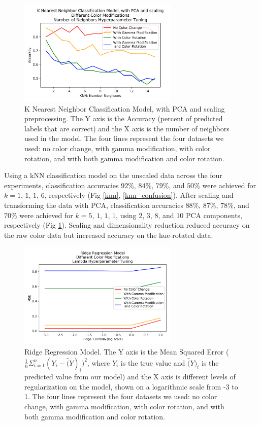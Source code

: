 \documentclass[journal]{IEEEtran}
\begin{document}
\begin{figure}
\centering
\includegraphics[height=2in]{KNN_clf_PCA/knn_classification.png}
\caption{K Nearest Neighbor Classification Model, with PCA and scaling preprocessing. The Y axis is the Accuracy (percent of predicted labels that are correct) and the X axis is the number of neighbors used in the model. The four lines represent the four datasets we used: no color change, with gamma modification, with color rotation, and with both gamma modification and color rotation.}
\label{knn_pca}
\end{figure}

Using a kNN classification model on the unscaled data across the four experiments, classification accuracies $92\%$, $84\%$, $79\%$, and $50\%$ were achieved for $k=1$, $1$, $1$, $6$, respectively (Fig \ref{knn}, \ref{knn_confusion}). After scaling and transforming the data with PCA, classification accuracies $88\%$, $87\%$, $78\%$, and $70\%$ were achieved for $k=5$, $1$, $1$, $1$, using $2$, $3$, $8$, and $10$ PCA components, respectively (Fig \ref{knn_pca}). Scaling and dimensionality reduction reduced accuracy on the raw color data but increased accuracy on the hue-rotated data.

\begin{figure}
\centering
\includegraphics[height=2in]{Ridge/ridge_regression3.png}
\caption{Ridge Regression Model. The Y axis is the Mean Squared Error ($\frac{1}{n} \Sigma_{i=1}^n (Y_i - \hat(Y)_i)^2$, where $Y_i$ is the true value and $\hat(Y)_i$ is the predicted value from our model) and the X axis is different levels of regularization on the model, shown on a logarithmic scale from -3 to 1. The four lines represent the four datasets we used: no color change, with gamma modification, with color rotation, and with both gamma modification and color rotation.}
\label{ridge}
\end{figure}
\end{document}
